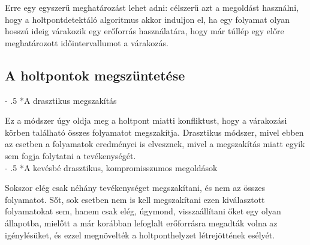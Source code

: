 \documentclass[tikz,12pt,margin=0px]{article}
\makeatletter
\renewcommand\paragraph{%
	\@startsection{paragraph}{4}{0mm}%
	{-\baselineskip}%
	{.5\baselineskip}%
	{\normalfont\normalsize\bfseries}}
\makeatother
\begin{document}
    \noindent Erre egy egyszerű meghatározást lehet adni: célszerű azt a megoldást használni, hogy a holtpontdetektáló algoritmus akkor induljon el, ha egy folyamat olyan hosszú ideig várakozik egy erőforrás használatára, hogy már túllép egy előre meghatározott időintervallumot a várakozás.\\

    \subsection*{A holtpontok megszüntetése\\}

    \paragraph*{A drasztikus megszakítás}

    Ez a módszer úgy oldja meg a holtpont miatti konfliktust, hogy a várakozási körben található összes folyamatot megszakítja. Drasztikus módszer, mivel ebben az esetben a folyamatok eredményei is elvesznek, mivel a megszakítás miatt egyik sem fogja folytatni a tevékenységét.\\

    \paragraph*{A kevésbé drasztikus, kompromisszumos megoldások}

    \noindent Sokszor elég csak néhány tevékenységet megszakítani, és nem az összes folyamatot. Sőt, sok esetben nem is kell megszakítani ezen kiválasztott folyamatokat sem, hanem csak elég, úgymond, visszaállítani őket egy olyan állapotba, mielőtt a már korábban lefoglalt erőforrásra megadták volna az igénylésüket, és ezzel megnövelték a holtponthelyzet létrejöttének esélyét.\\
\end{document}
